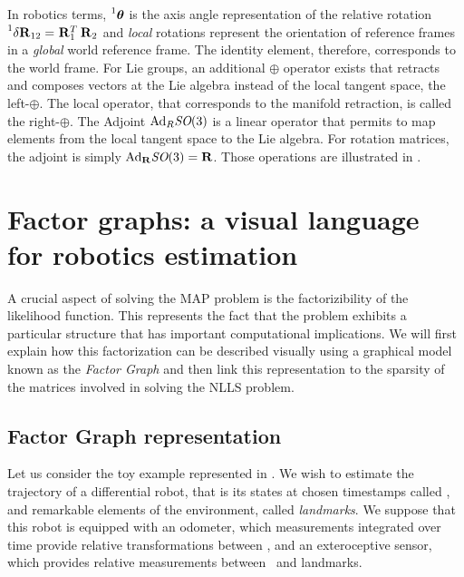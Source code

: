 In robotics terms, $\prescript{1}{}{{\bm \theta}}$ is the axis angle representation of the relative rotation $\prescript{1}{}{\delta {\bf R}}_{12} = \prescript{}{}{{\bf R}}_{1}^T\prescript{}{}{{\bf R}}_{2}$ and
\textit{local} rotations represent the orientation of reference frames in a \textit{global} world reference frame. The identity element, therefore, corresponds 
to the world frame. For Lie groups, an additional $\oplus$ operator exists that retracts and composes vectors at the Lie algebra instead of
the local tangent space, the left-$\oplus$. The local operator, that corresponds to the manifold retraction, is called the right-$\oplus$. 
The Adjoint $\text{Ad}_{R}\textit{SO}(3)$ is a linear operator that permits to map elements from the local tangent space to the Lie algebra. 
For rotation matrices, the adjoint is simply $\text{Ad}_{{\bf R}}\textit{SO}(3)={\bf R}$. Those operations are illustrated in .


%
%
%
\section{Factor graphs: a visual language for robotics estimation}
\label{sec:factor_graphs}

A crucial aspect of solving the MAP problem is the factorizibility of the likelihood function. This represents the fact that the problem
exhibits a particular structure that has important computational implications. We will first explain how this factorization can be described 
visually using a graphical model known as the \textit{Factor Graph} and then link this representation to the sparsity of the matrices involved
in solving the NLLS problem.


\subsection{Factor Graph representation}
Let us consider the toy example represented in . 
We wish to estimate the trajectory of a differential robot, that is its states at chosen timestamps called \textit{\keyframes}, and remarkable elements 
of the environment, called \textit{landmarks}. We suppose that this robot is equipped with an odometer, which measurements integrated over time provide relative 
transformations between \keyframes, and an exteroceptive sensor, which provides relative measurements between \keyframes~and landmarks.

